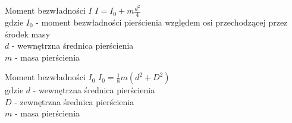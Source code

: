 Moment bezwładności $I$ \dotfill \quad $\displaystyle I = I_0 + m \frac{d^2}{4}$ \\
{ \small
    \indent \qquad gdzie $I_0$ - moment bezwładności pierścienia względem osi przechodzącej przez środek masy \\
    \indent \qquad $d$ - wewnętrzna średnica pierścienia \\
    \indent \qquad $m$ - masa pierścienia \\
}

Moment bezwładności $I_0$ \dotfill \quad $\displaystyle I_0 = \frac{1}{8} m(d^2 + D^2)$ \\
{ \small
    \indent \qquad gdzie $d$ - wewnętrzna średnica pierścienia \\
    \indent \qquad $D$ - zewnętrzna średnica pierścienia \\
    \indent \qquad $m$ - masa pierścienia \\
}
